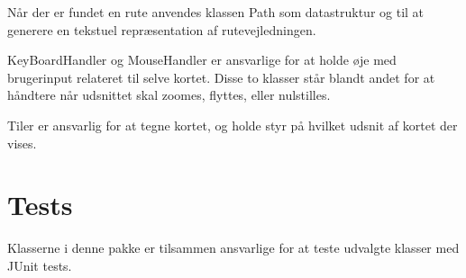 Når der er fundet en rute anvendes klassen Path som datastruktur og til at generere en tekstuel repræsentation af rutevejledningen.

KeyBoardHandler og MouseHandler er ansvarlige for at holde øje med brugerinput relateret til selve kortet. Disse to klasser står blandt andet for at håndtere når udsnittet skal zoomes, flyttes, eller nulstilles.

Tiler er ansvarlig for at tegne kortet, og holde styr på hvilket udsnit af kortet der vises.

\section{Tests}
\label{sec:tests}

Klasserne i denne pakke er tilsammen ansvarlige for at teste udvalgte klasser med JUnit tests.